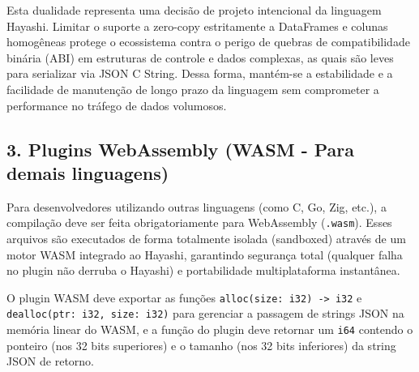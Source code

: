 Esta dualidade representa uma decisão de projeto intencional da linguagem Hayashi. Limitar o suporte a zero-copy estritamente a DataFrames e colunas homogêneas protege o ecossistema contra o perigo de quebras de compatibilidade binária (ABI) em estruturas de controle e dados complexas, as quais são leves para serializar via JSON C String. Dessa forma, mantém-se a estabilidade e a facilidade de manutenção de longo prazo da linguagem sem comprometer a performance no tráfego de dados volumosos.


\subsection{3. Plugins WebAssembly (WASM - Para demais linguagens)}
Para desenvolvedores utilizando outras linguagens (como C, Go, Zig, etc.), a compilação deve ser feita obrigatoriamente para WebAssembly (\texttt{.wasm}). Esses arquivos são executados de forma totalmente isolada (sandboxed) através de um motor WASM integrado ao Hayashi, garantindo segurança total (qualquer falha no plugin não derruba o Hayashi) e portabilidade multiplataforma instantânea.

O plugin WASM deve exportar as funções \texttt{alloc(size: i32) -> i32} e \texttt{dealloc(ptr: i32, size: i32)} para gerenciar a passagem de strings JSON na memória linear do WASM, e a função do plugin deve retornar um \texttt{i64} contendo o ponteiro (nos 32 bits superiores) e o tamanho (nos 32 bits inferiores) da string JSON de retorno.
